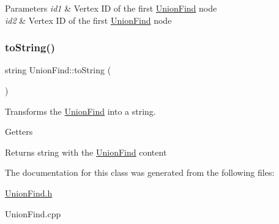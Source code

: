 \begin{DoxyParams}{Parameters}
{\em id1} & Vertex ID of the first \hyperlink{classUnionFind}{Union\+Find} node \\
\hline
{\em id2} & Vertex ID of the first \hyperlink{classUnionFind}{Union\+Find} node \\
\hline
\end{DoxyParams}
\mbox{\label{classUnionFind_a745c39dc529d7fd20536bed4ceeca069}} 
\subsubsection{\texorpdfstring{to\+String()}{toString()}}
{\footnotesize\ttfamily string Union\+Find\+::to\+String (\begin{DoxyParamCaption}{ }\end{DoxyParamCaption})}



Transforms the \hyperlink{classUnionFind}{Union\+Find} into a string. 

Getters \begin{DoxyReturn}{Returns}
string with the \hyperlink{classUnionFind}{Union\+Find} content 
\end{DoxyReturn}


The documentation for this class was generated from the following files\+:\begin{DoxyCompactItemize}
\item 
\hyperlink{UnionFind_8h}{Union\+Find.\+h}\item 
Union\+Find.\+cpp\end{DoxyCompactItemize}
